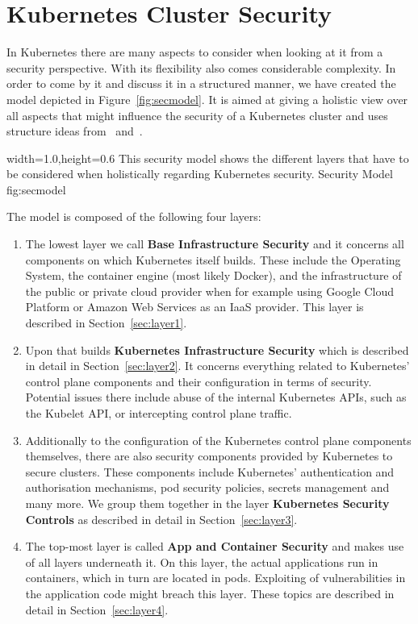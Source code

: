 \chapter{Kubernetes Cluster Security}

In Kubernetes there are many aspects to consider when looking at it from a security perspective. With its flexibility also comes considerable complexity. In order to come by it and discuss it in a structured manner, we have created the model depicted in Figure~\ref{fig:secmodel}. It is aimed at giving a holistic view over all aspects that might influence the security of a Kubernetes cluster and uses structure ideas from~\textcite{securingkubernetes} and~\textcite{kubernetessecurity}.

  {width=1.0\textwidth,height=0.6\textheight}%
  {This security model shows the different layers that have to be considered when holistically regarding Kubernetes security.}%
  {Security Model}%
  {fig:secmodel}%

The model is composed of the following four layers:

\begin{enumerate}
    \item The lowest layer we call \textbf{Base Infrastructure Security} and it concerns all components on which Kubernetes itself builds. These include the Operating System, the container engine (most likely Docker), and the infrastructure of the public or private cloud provider when for example using Google Cloud Platform or Amazon Web Services as an \ac{IaaS} provider. This layer is described in Section~\ref{sec:layer1}.
    \item Upon that builds \textbf{Kubernetes Infrastructure Security} which is described in detail in Section~\ref{sec:layer2}. It concerns everything related to Kubernetes' control plane components and their configuration in terms of security. Potential issues there include abuse of the internal Kubernetes APIs, such as the Kubelet API, or intercepting control plane traffic.
    \item Additionally to the configuration of the Kubernetes control plane components themselves, there are also security components provided by Kubernetes to secure clusters. These components include Kubernetes' authentication and authorisation mechanisms, pod security policies, secrets management and many more. We group them together in the layer \textbf{Kubernetes Security Controls} as described in detail in Section~\ref{sec:layer3}.
    \item The top-most layer is called \textbf{App and Container Security} and makes use of all layers underneath it. On this layer, the actual applications run in containers, which in turn are located in pods. Exploiting of vulnerabilities in the application code might breach this layer. These topics are described in detail in Section~\ref{sec:layer4}.
\end{enumerate}

